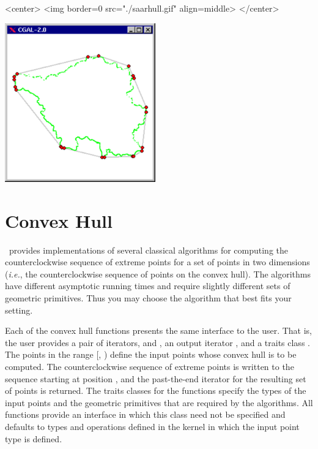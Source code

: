 \begin{ccHtmlOnly}
<center>
<img border=0 src="./saarhull.gif" align=middle>
</center>
\end{ccHtmlOnly} 

\begin{ccTexOnly}
\begin{center}
\includegraphics[width=6.5cm]{Convex_hull_2/saarhull}
\end{center}
\end{ccTexOnly}

\section{Convex Hull}
\label{sec:convex_hull_2}
\cgal\ provides implementations of several classical algorithms for
computing the counterclockwise sequence of extreme points for a set of 
points in two dimensions (\textit{i.e.}, the counterclockwise sequence 
of points on the convex hull).  The algorithms have different asymptotic
running times and require slightly different sets of geometric primitives. 
Thus you may choose the algorithm that best fits your setting.

Each of the convex hull functions presents the same interface to the
user.  That is, the user provides a pair of iterators, 
and , an output iterator ,  and a traits class
. The points in the range [, ) define
the input points whose convex hull is to be computed.  The counterclockwise
sequence of extreme points is written to the sequence starting at position
, and the past-the-end iterator for the resulting set of
points is returned.  The traits classes for the functions specify the types
of the input points and the geometric primitives that are required by
the algorithms. All functions provide an interface in which this
class need not be specified and defaults to types and operations defined
in the kernel in which the input point type is defined.

